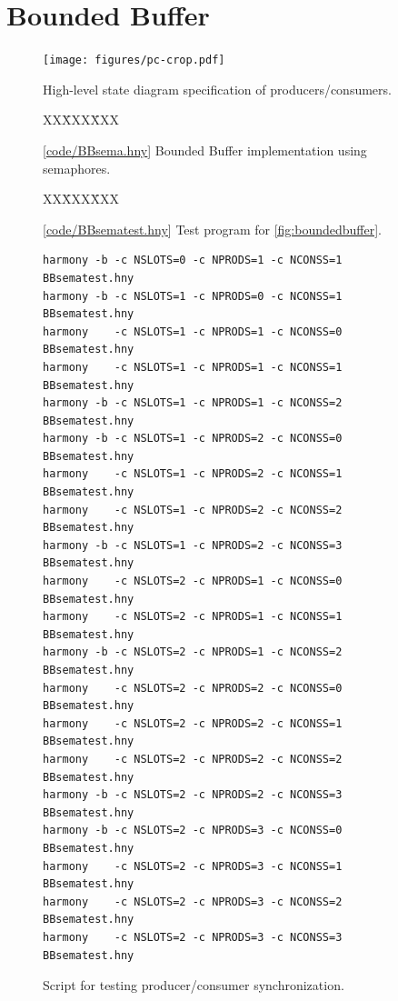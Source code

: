 \documentclass{report}
\newcommand{\harmonysource}[1]{
\begin{tabbing}
XX\=XXX\=XXX\kill
    
\end{tabbing}
}
\newcommand{\harmonylink}[1]{%
[\href{https://www.cs.cornell.edu/home/rvr/harmony/#1}{\underline{#1}}]%
}
\newenvironment{code}{
\tcolorbox
}{
\endtcolorbox
}
\begin{document}
\chapter{Bounded Buffer}
\label{ch:bb}
%
%

%

\begin{figure}
\begin{center}
\texttt{[image: figures/pc-crop.pdf]}
\end{center}
\caption{High-level state diagram specification of producers/consumers.}
\label{fig:pc}
\end{figure}

\begin{figure}
\begin{code}
\harmonysource{BBsema}
\end{code}
\caption{\harmonylink{code/BBsema.hny} Bounded Buffer implementation using semaphores.}
\label{fig:boundedbuffer}
\end{figure}

\begin{figure}
\begin{code}
\harmonysource{BBsematest}
\end{code}
\caption{\harmonylink{code/BBsematest.hny} Test program for \autoref{fig:boundedbuffer}.}
\label{fig:bbtest}
\end{figure}

\begin{figure}
\begin{code}
\begin{verbatim}
harmony -b -c NSLOTS=0 -c NPRODS=1 -c NCONSS=1 BBsematest.hny
harmony -b -c NSLOTS=1 -c NPRODS=0 -c NCONSS=1 BBsematest.hny
harmony    -c NSLOTS=1 -c NPRODS=1 -c NCONSS=0 BBsematest.hny
harmony    -c NSLOTS=1 -c NPRODS=1 -c NCONSS=1 BBsematest.hny
harmony -b -c NSLOTS=1 -c NPRODS=1 -c NCONSS=2 BBsematest.hny
harmony -b -c NSLOTS=1 -c NPRODS=2 -c NCONSS=0 BBsematest.hny
harmony    -c NSLOTS=1 -c NPRODS=2 -c NCONSS=1 BBsematest.hny
harmony    -c NSLOTS=1 -c NPRODS=2 -c NCONSS=2 BBsematest.hny
harmony -b -c NSLOTS=1 -c NPRODS=2 -c NCONSS=3 BBsematest.hny
harmony    -c NSLOTS=2 -c NPRODS=1 -c NCONSS=0 BBsematest.hny
harmony    -c NSLOTS=2 -c NPRODS=1 -c NCONSS=1 BBsematest.hny
harmony -b -c NSLOTS=2 -c NPRODS=1 -c NCONSS=2 BBsematest.hny
harmony    -c NSLOTS=2 -c NPRODS=2 -c NCONSS=0 BBsematest.hny
harmony    -c NSLOTS=2 -c NPRODS=2 -c NCONSS=1 BBsematest.hny
harmony    -c NSLOTS=2 -c NPRODS=2 -c NCONSS=2 BBsematest.hny
harmony -b -c NSLOTS=2 -c NPRODS=2 -c NCONSS=3 BBsematest.hny
harmony -b -c NSLOTS=2 -c NPRODS=3 -c NCONSS=0 BBsematest.hny
harmony    -c NSLOTS=2 -c NPRODS=3 -c NCONSS=1 BBsematest.hny
harmony    -c NSLOTS=2 -c NPRODS=3 -c NCONSS=2 BBsematest.hny
harmony    -c NSLOTS=2 -c NPRODS=3 -c NCONSS=3 BBsematest.hny
\end{verbatim}
\end{code}
\caption{Script for testing producer/consumer synchronization.}
\label{fig:pcscript}
\end{figure}
\end{document}
